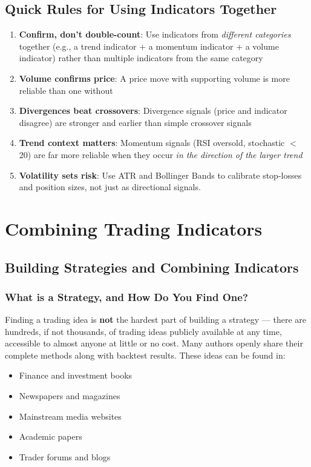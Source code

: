 \documentclass[12pt,openany]{book}
\begin{document}
\subsection{Quick Rules for Using Indicators Together}

\begin{enumerate}[leftmargin=*]
    \item \textbf{Confirm, don't double-count}: Use indicators from \emph{different categories} together (e.g., a trend indicator + a momentum indicator + a volume indicator) rather than multiple indicators from the same category
    \item \textbf{Volume confirms price}: A price move with supporting volume is more reliable than one without
    \item \textbf{Divergences beat crossovers}: Divergence signals (price and indicator disagree) are stronger and earlier than simple crossover signals
    \item \textbf{Trend context matters}: Momentum signals (RSI oversold, stochastic \(<\) 20) are far more reliable when they occur \emph{in the direction of the larger trend}
    \item \textbf{Volatility sets risk}: Use ATR and Bollinger Bands to calibrate stop-losses and position sizes, not just as directional signals.
\end{enumerate}

\section{Combining Trading Indicators}

\subsection{Building Strategies and Combining Indicators}

\subsubsection{What is a Strategy, and How Do You Find One?}

Finding a trading idea is \textbf{not} the hardest part of building a strategy --- there are hundreds, if not thousands, of trading ideas publicly available at any time, accessible to almost anyone at little or no cost. Many authors openly share their complete methods along with backtest results. These ideas can be found in:
\begin{itemize}[leftmargin=*]
    \item Finance and investment books
    \item Newspapers and magazines
    \item Mainstream media websites
    \item Academic papers
    \item Trader forums and blogs
\end{itemize}
\end{document}
